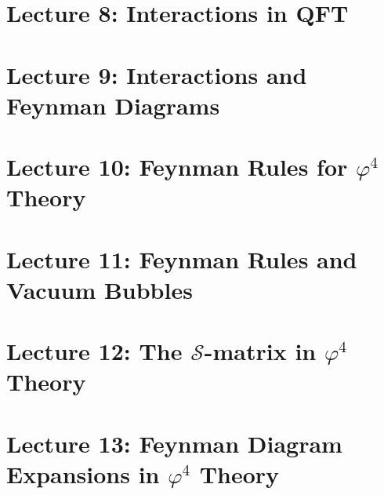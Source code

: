\documentclass[10pt]{article}
\begin{document}


\clearpage

\section*{Lecture 8: Interactions in QFT}
\label{sec:lec8}



\clearpage

\section*{Lecture 9: Interactions and Feynman Diagrams}
\label{sec:lec9}



\clearpage

\section*{Lecture 10: Feynman Rules for $\varphi^4$ Theory}
\label{sec:lec10}



\clearpage

\section*{Lecture 11: Feynman Rules and Vacuum Bubbles}
\label{sec:lec11}



\clearpage

\section*{Lecture 12: The $\mathcal{S}$-matrix in $\varphi^4$ Theory}
\label{sec:lec12}



\clearpage

\section*{Lecture 13: Feynman Diagram Expansions in $\varphi^4$ Theory}
\label{sec:lec13}

 

\clearpage
\end{document}
